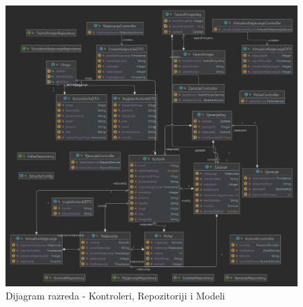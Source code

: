 \begin{figure}[H]
	\includegraphics[scale=0.2]{dijagrami/apiDiagram.png}
	\centering
	\caption{Dijagram razreda - Kontroleri, Repozitoriji i Modeli}
\end{figure}

%
%
%
%
%
%
%
%
%
%
%
%
%
%
%
%
